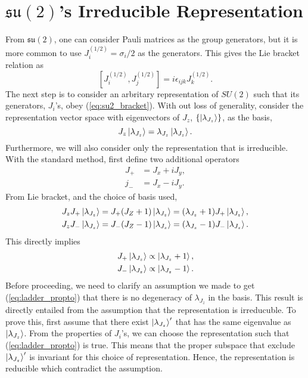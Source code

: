 \documentclass[12pt]{revtex4-2}
\begin{document}
\section{$\mathfrak{su(2)}$'s Irreducible Representation}
From $\mathfrak{su(2)}$, one can consider Pauli matrices as the group generators, but it is more
common to use $J^{(1/2)}_i = \sigma_i/2$ as the generators. This gives the Lie bracket relation as
\begin{equation} \label{eq:su2_bracket}
    \left[J^{(1/2)}_i, J^{(1/2)}_j\right] = i\epsilon_{ijk}J^{(1/2)}_k.
\end{equation}
The next step is to consider an arbritary representation of $SU(2)$ such that its generators, $J_i$'s,
obey (\ref{eq:su2_bracket}). With out loss of generality, consider the representation vector space with eigenvectors of
$J_z$, $\{\ket{\lambda_{J_z}}\}$, as the basis,
\begin{equation}
    J_z\ket{\lambda_{J_z}}=\lambda_{J_z}\ket{\lambda_{J_z}}.
\end{equation}
Furthermore, we will also consider only the representation that is irreducible. With the standard method, first define 
two additional operators
\begin{equation}
    \begin{aligned}
        J_+ &= J_x + iJ_y, \\
        j_- &= J_x - iJ_y.
    \end{aligned}
\end{equation}
From Lie bracket, and the choice of basis used,
\begin{equation}
    \begin{aligned}
        J_zJ_+\ket{\lambda_{J_z}} &= J_+(J_Z+1)\ket{\lambda_{J_z}} = (\lambda_{J_z}+1)J_+\ket{\lambda_{J_z}}, \\
        J_zJ_-\ket{\lambda_{J_z}} &= J_-(J_Z-1)\ket{\lambda_{J_z}} = (\lambda_{J_z}-1)J_-\ket{\lambda_{J_z}}.
    \end{aligned}
\end{equation}
This directly implies
\begin{equation} \label{eq:ladder_propto}
    \begin{aligned}
        J_+\ket{\lambda_{J_z}} &\propto \ket{\lambda_{J_z}+1}, \\
        J_-\ket{\lambda_{J_z}} &\propto \ket{\lambda_{J_z}-1}.
    \end{aligned}
\end{equation}
Before proceeding, we need to clarify an assumption we made to get (\ref{eq:ladder_propto}) that there is no degeneracy
of $\lambda_{J_z}$ in the basis. This result is directly entailed from the assumption that the representation is irreducuble.
To prove this, first assume that there exist $\ket{\lambda_{J_z}}'$ that has the same eigenvalue as $\ket{\lambda_{J_z}}$.
From the properties of $J_i$'s, we can choose the representation such that (\ref{eq:ladder_propto}) is true.
This means that the proper subspace that exclude $\ket{\lambda_{J_z}}'$ is invariant for this choice of representation.
Hence, the representation is reducible which contradict the assumption.
\end{document}
